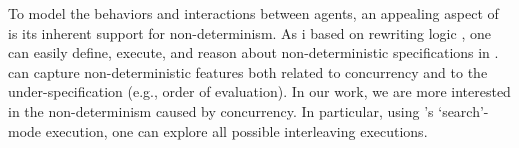 To model the behaviors and interactions between agents, an appealing aspect of \K is its inherent support for non-determinism.
As \K i based on rewriting logic \cite{meseguer2007rewriting}, one can easily define, execute, and reason about non-deterministic specifications in \K. 
\K can capture non-deterministic features both related to concurrency and to the under-specification (e.g., order of evaluation). 
In our work, we are more interested in the non-determinism caused by concurrency. In particular, using \K's `search'-mode execution, one can explore all possible interleaving executions.